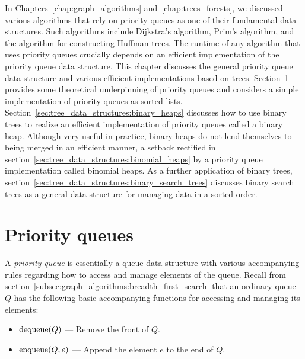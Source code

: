 \noindent
In Chapters~\ref{chap:graph_algorithms} and~\ref{chap:trees_forests},
we discussed various algorithms that rely on
priority queues as one of their fundamental data
structures. Such algorithms include
Dijkstra's algorithm,
Prim's algorithm, and the algorithm for
constructing Huffman trees. The runtime of any
algorithm that uses priority queues crucially depends on an efficient
implementation of the priority queue data
structure. This chapter discusses the general priority queue data
structure and various efficient implementations based on trees.
Section~\ref{sec:tree_data_structures:priority_queues} provides some
theoretical underpinning of priority queues and considers a simple
implementation of priority queues as sorted lists.
Section~\ref{sec:tree_data_structures:binary_heaps} discusses how to
use binary trees to realize an efficient
implementation of priority queues called a binary
heap. Although very useful in practice, binary heaps do not lend
themselves to being merged in an efficient manner, a setback rectified
in section~\ref{sec:tree_data_structures:binomial_heaps} by a priority
queue implementation called binomial heaps. As a
further application of binary trees,
section~\ref{sec:tree_data_structures:binary_search_trees} discusses
binary search trees as a general data
structure for managing data in a sorted order.



\section{Priority queues}
\label{sec:tree_data_structures:priority_queues}

A \emph{priority queue} is essentially a queue
data structure with various accompanying rules regarding how to access
and manage elements of the queue. Recall from
section~\ref{subsec:graph_algorithms:breadth_first_search} that an
ordinary queue $Q$ has the following basic accompanying functions for
accessing and managing its elements:
\begin{itemize}
\item $\operatorname*{dequeue}(Q)$ --- Remove the front of $Q$.

\item $\operatorname*{enqueue}(Q, e)$ --- Append the element $e$ to the end of $Q$.
\end{itemize}

